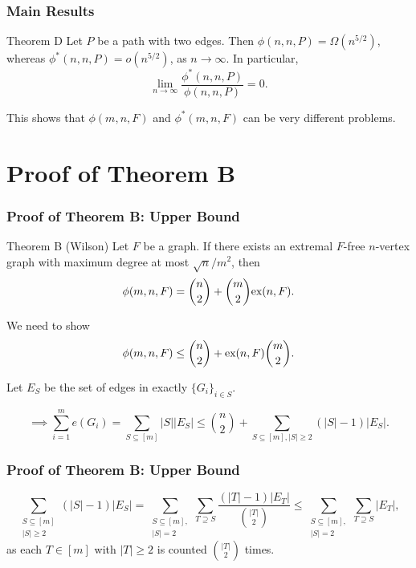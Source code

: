 \documentclass{beamer}
\newcommand*{\ex}{\textnormal{ex}}
\begin{document}
\begin{frame}
  \frametitle{Main Results}

  \begin{block}{Theorem D}
    Let $P$ be a path with two edges. Then $\phi(n, n, P) = \Omega(n^{5/2})$, whereas $\phi^*(n, n, P) = o(n^{5/2})$, as $n \rightarrow \infty$. In particular, 
    \[ 
      \lim_{n \rightarrow \infty} \frac{\phi^*(n, n, P)}{\phi(n, n, P)} = 0.
    \]
  \end{block}

  \pause

  \vspace{0.3cm}

  This shows that $\phi(m, n, F)$ and $\phi^*(m, n, F)$ can be very different problems.
\end{frame}

\section{Proof of Theorem B}

\begin{frame}
  \frametitle{Proof of Theorem B: Upper Bound}

  \begin{block}{Theorem B (Wilson)}
    Let $F$ be a graph. If there exists an extremal $F$-free $n$-vertex graph with maximum degree at most $\sqrt{n}/m^2$, then 
    \[ 
      \phi(m, n, F) = \binom{n}{2} + \binom{m}{2}\ex(n,F).
    \]
  \end{block}

  \pause

  We need to show
  \[  
    \phi(m, n ,F) \leq \binom{n}{2} + \ex(n, F)\binom{m}{2}.  
  \]

  \pause
  
  Let $E_S$ be the set of edges in exactly $\{G_i\}_{i \in S}$.

  \pause

  \[
    \implies \sum_{i = 1}^m e(G_i) = \sum_{S \subseteq [m]} |S||E_S| \leq \binom{n}{2} + \sum_{S \subseteq [m], |S| \geq 2} (|S| - 1)|E_S|.
  \]
\end{frame}

\begin{frame}

  \frametitle{Proof of Theorem B: Upper Bound}

  \[
    \sum_{\substack{S \subseteq [m] \\ |S| \geq 2}} (|S| - 1)|E_S| = \sum_{\substack{S \subseteq [m], \\ |S| = 2}} \sum_{T \supseteq S} \frac{(|T| - 1)|E_T|}{\binom{|T|}{2}} \leq \sum_{\substack{S \subseteq [m], \\ |S| = 2}} \sum_{T \supseteq S} |E_T|,
  \]
  as each $T \in [m]$ with $|T| \geq 2$ is counted $\binom{|T|}{2}$ times.
\end{frame}
\end{document}
